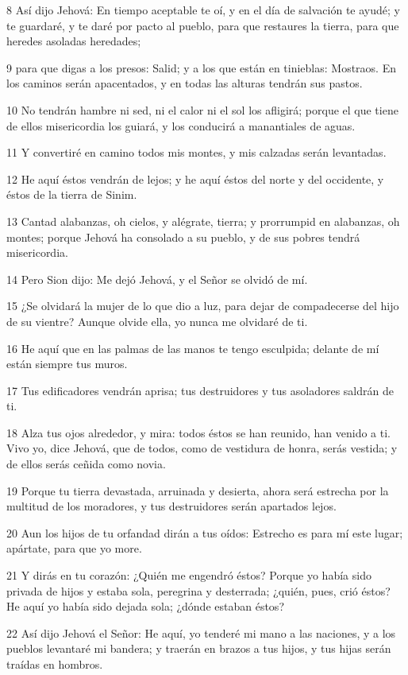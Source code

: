 \par 8 Así dijo Jehová: En tiempo aceptable te oí, y en el día de salvación te ayudé; y te guardaré, y te daré por pacto al pueblo, para que restaures la tierra, para que heredes asoladas heredades;
\par 9 para que digas a los presos: Salid; y a los que están en tinieblas: Mostraos. En los caminos serán apacentados, y en todas las alturas tendrán sus pastos.
\par 10 No tendrán hambre ni sed, ni el calor ni el sol los afligirá; porque el que tiene de ellos misericordia los guiará, y los conducirá a manantiales de aguas. 
\par 11 Y convertiré en camino todos mis montes, y mis calzadas serán levantadas.
\par 12 He aquí éstos vendrán de lejos; y he aquí éstos del norte y del occidente, y éstos de la tierra de Sinim.
\par 13 Cantad alabanzas, oh cielos, y alégrate, tierra; y prorrumpid en alabanzas, oh montes; porque Jehová ha consolado a su pueblo, y de sus pobres tendrá misericordia.
\par 14 Pero Sion dijo: Me dejó Jehová, y el Señor se olvidó de mí.
\par 15 ¿Se olvidará la mujer de lo que dio a luz, para dejar de compadecerse del hijo de su vientre? Aunque olvide ella, yo nunca me olvidaré de ti.
\par 16 He aquí que en las palmas de las manos te tengo esculpida; delante de mí están siempre tus muros.
\par 17 Tus edificadores vendrán aprisa; tus destruidores y tus asoladores saldrán de ti.
\par 18 Alza tus ojos alrededor, y mira: todos éstos se han reunido, han venido a ti. Vivo yo, dice Jehová, que de todos, como de vestidura de honra, serás vestida; y de ellos serás ceñida como novia.
\par 19 Porque tu tierra devastada, arruinada y desierta, ahora será estrecha por la multitud de los moradores, y tus destruidores serán apartados lejos.
\par 20 Aun los hijos de tu orfandad dirán a tus oídos: Estrecho es para mí este lugar; apártate, para que yo more.
\par 21 Y dirás en tu corazón: ¿Quién me engendró éstos? Porque yo había sido privada de hijos y estaba sola, peregrina y desterrada; ¿quién, pues, crió éstos? He aquí yo había sido dejada sola; ¿dónde estaban éstos?
\par 22 Así dijo Jehová el Señor: He aquí, yo tenderé mi mano a las naciones, y a los pueblos levantaré mi bandera; y traerán en brazos a tus hijos, y tus hijas serán traídas en hombros.

